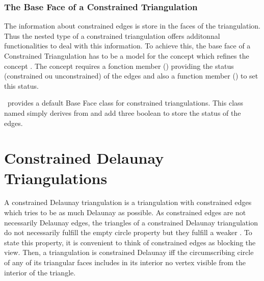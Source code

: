\subsubsection{The Base Face of a Constrained Triangulation}
 The information about constrained edges is store in the 
faces of the triangulation. Thus the nested 
type of a constrained triangulation offers
additonnal functionalities to deal with this information.
To achieve this, the base face of a Constrained Triangulation
has to be a model for the concept 
which refines the concept .
The concept 
requires  a fonction member
()
 providing the status
(constrained ou unconstrained) of the edges
and also a function member
() to set this status.


\cgal\ provides a default Base Face class
for constrained triangulations. This class named
simply derives from 
and add three boolean to store the status of the edges. 


\section{Constrained Delaunay Triangulations}
\label{Section_2D_Triangulations_Constrained_Delaunay}

\label{Subsection_2D_Triangulations_Constrained_Delaunay_Description}
A constrained Delaunay triangulation is a triangulation with
constrained edges which tries to be as much Delaunay as possible.
As constrained edges are not necessarily Delaunay edges,
the triangles of a constrained Delaunay triangulation do not
necessarily fulfill the empty circle property
but they fulfill a weaker .
 To state this property,
it is convenient to think of  constrained
edges as blocking the view. Then, a triangulation is 
constrained Delaunay iff
 the circumscribing circle
of any of its triangular faces includes in its interior 
no vertex  visible
from the interior of the triangle.

